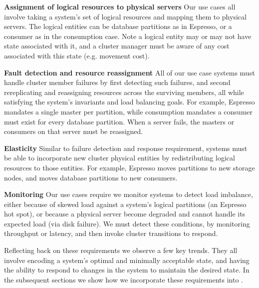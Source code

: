 \squishlist
\item \textbf{Assignment of logical resources to physical servers}
Our use cases all involve taking a system's set of logical resources and mapping
them to physical servers.  The logical entities can be database partitions as in
Espresso, or a consumer as in the \databus consumption case.  Note a logical
entity may or may not have state associated with it, and a cluster manager must
be aware of any cost associated with this state (e.g. movement cost).
\item \textbf{Fault detection and resource reassignment}
All of our use case systems must handle cluster member failures by first
detecting such failures, and second rereplicating and reassigning resources 
across the surviving members, all while satisfying the system's invariants and 
load balancing goals.  For example, Espresso mandates a single master per
partition, while \databus consumption mandates a consumer must exist for every
database partition.  When a server fails, the masters or consumers on that
server must be reassigned. 
\item \textbf{Elasticity} 
Similar to failure detection and response requirement, systems must be able to
incorporate new cluster physical entities by redistributing logical resources
to those entities.  For example, Espresso moves partitions to new storage nodes,
and \databus moves database partitions to new consumers.  
\item \textbf{Monitoring}
Our use cases require we monitor systems to detect load imbalance, either
because of skewed load against a system's logical partitions (\eg an Espresso
hot spot), or because a physical server become degraded and cannot
handle its expected load (\eg via disk failure).  We must detect these
conditions, \eg by monitoring throughput or latency, and then invoke cluster
transitions to respond.
\squishend
 
Reflecting back on these requirements we observe a few key trends.  They all
involve encoding a system's optimal and minimally acceptable state, and having the ability
to respond to changes in the system to maintain the desired state.  In the
subsequent sections we show how we incorporate these requirements into \helix. 

